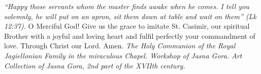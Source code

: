 \pagestyle{empty}
\hspace{0pt}
\vfill

\textit{``Happy those servants whom the master finds awake
when he comes. I tell you solemnly, he will put on an apron, sit
them down at table and wait on them'' (Lk 12:37).}
\medbreak
O Merciful God! Give us the grace to imitate St. Casimir,
our spiritual Brother with a joyful and loving heart and fulfil perfectly your commandment of love. Through Christ our Lord.
Amen.
\vfill
\textit{The Holy Communion of the Royal Jagiellonian Family in the miraculous Chapel.
Workshop of Jasna Gora. Art Collection of Jasna Gora,
2nd part of the XVIIth century.}
\hspace{0pt}
\newpage
